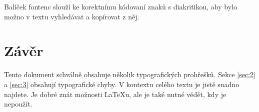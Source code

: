 \documentclass[twocolumn, 10pt]{article}[26.02.2022]
\begin{document}
Balíček {\selectfont fontenc} slouží ke korektnímu kódovaní znaků s diakritikou, aby bylo možno v textu vyhledávat a kopírovat z něj.

\section{Závěr}
Tento dokument schválně obsahuje několik typografických prohřešků.
Sekce \ref{sec:2} a \ref{sec:3} obsahují typografické chyby.
V kontextu celého textu je jistě snadno najdete.
Je dobré znát možnosti \LaTeX u, ale je také nutné vědět, kdy je nepoužít.
\end{document}

